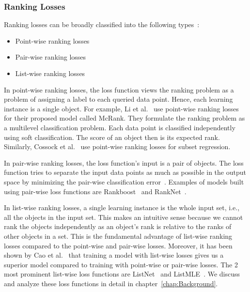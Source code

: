 \documentclass[12pt, twoside, ngerman]{report}
\begin{document}
\subsubsection{Ranking Losses}
\label{sec:ranklearning}

Ranking losses can be broadly classified into the following types~\cite{RankingLossFirstPaperRead}:
\begin{itemize}
\item  Point-wise ranking losses
\item  Pair-wise ranking losses
\item  List-wise ranking losses
\end{itemize}

In point-wise ranking losses,  the loss function views the ranking problem as a problem of assigning a label to each queried data point.
Hence,  each learning instance is a single object.
For example, Li et al.~\cite{McRank} use point-wise ranking losses for their proposed model called McRank.
They formulate the ranking problem as a multilevel classification problem.
Each data point is classified independently using soft classification.
The score of an object then is its expected rank.
Similarly, Cossock et al.~\cite{subsetregressionpaper} use point-wise ranking losses for subset regression. 

In pair-wise ranking losses,  the loss function's input is a pair of objects.
The loss function tries to separate the input data points as much as possible in the output space by minimizing the pair-wise classification error~\cite{pairwisepreferencespaper}.
Examples of models built using pair-wise loss functions are Rankboost~\cite{rankboostpaper} and RankNet~\cite{ranknetpaper}.

In list-wise ranking losses,  a single learning instance is the whole input set, i.e., all the objects in the input set.
This makes an intuitive sense because we cannot rank the objects independently as an object's rank is relative to the ranks of other objects in a set.
This is the fundamental advantage of list-wise ranking losses compared to the point-wise and pair-wise losses.
Moreover,  it has been shown by Cao et al.~\cite{listwisebetter} that training a model with list-wise losses gives us a superior model compared to training with point-wise or pair-wise losses.
The 2 most prominent list-wise loss functions are ListNet~\cite{listwisebetter} and ListMLE~\cite{listmlepaper}.
We discuss and analyze these loss functions in detail in chapter~\ref{chap:Background}.
\end{document}
